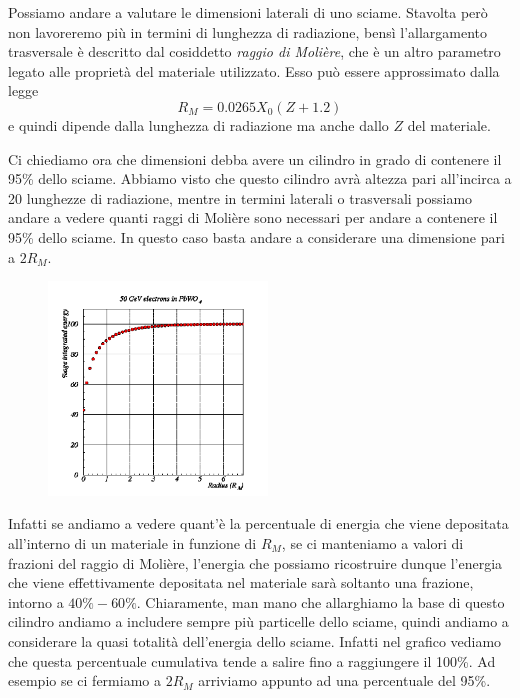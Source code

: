 Possiamo andare a valutare le dimensioni laterali di uno sciame. Stavolta però non lavoreremo più in termini di lunghezza di radiazione, bensì l'allargamento trasversale è descritto dal cosiddetto \textit{raggio di Molière}, che è un altro parametro legato alle proprietà del materiale utilizzato. Esso può essere approssimato dalla legge
\begin{equation*}
    R_{M}=0.0265 X_0 (Z + 1.2)
\end{equation*}
e quindi dipende dalla lunghezza di radiazione ma anche dallo $Z$ del materiale.

Ci chiediamo ora che dimensioni debba avere un cilindro in grado di contenere il 95\% dello sciame. Abbiamo visto che questo cilindro avrà altezza pari all'incirca a 20 lunghezze di radiazione, mentre in termini laterali o trasversali possiamo andare a vedere quanti raggi di Molière sono necessari per andare a contenere il 95\% dello sciame. In questo caso basta andare a considerare una dimensione pari a $2R_M$.

\begin{figure}[H]
    \centering
    \includegraphics[width=0.52\textwidth]{immagini/raggio_di_Moliere_1.png}
\end{figure}

Infatti se andiamo a vedere quant'è la percentuale di energia che viene depositata all'interno di un materiale in funzione di $R_M$, se ci manteniamo a valori di frazioni del raggio di Molière, l'energia che possiamo ricostruire dunque l'energia che viene effettivamente depositata nel materiale sarà soltanto una frazione, intorno a $40\%-60\%$. Chiaramente, man mano che allarghiamo la base di questo cilindro andiamo a includere sempre più particelle dello sciame, quindi andiamo a considerare la quasi totalità dell'energia dello sciame. Infatti nel grafico vediamo che questa percentuale cumulativa tende a salire fino a raggiungere il 100\%. Ad esempio se ci fermiamo a $2R_M$ arriviamo appunto ad una percentuale del 95\%.

